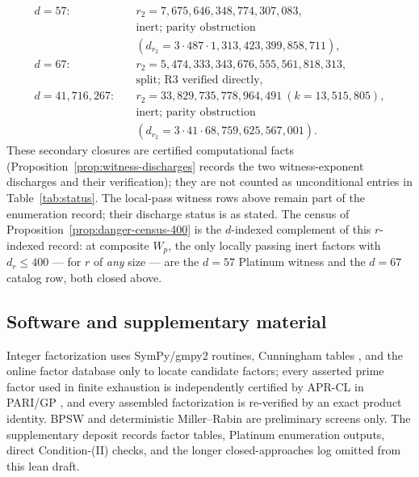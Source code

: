 \documentclass[11pt]{amsart}
\theoremstyle{plain}
\theoremstyle{definition}
\theoremstyle{remark}
\numberwithin{equation}{section}
\begin{document}
\[
  \begin{aligned}
  d=57:&\quad r_2=7{,}675{,}646{,}348{,}774{,}307{,}083,\\
       &\quad \text{inert; parity obstruction}\\
       &\quad (d_{r_2}=3\cdot487\cdot1{,}313{,}423{,}399{,}858{,}711),\\
  d=67:&\quad r_2=5{,}474{,}333{,}343{,}676{,}555{,}561{,}818{,}313,\\
       &\quad \text{split; R3 verified directly},\\
  d=41{,}716{,}267:&\quad r_2=33{,}829{,}735{,}778{,}964{,}491\ (k=13{,}515{,}805),\\
       &\quad \text{inert; parity obstruction}\\
       &\quad (d_{r_2}=3\cdot41\cdot68{,}759{,}625{,}567{,}001).
  \end{aligned}
\]
These secondary closures are certified computational facts (Proposition~\ref{prop:witness-discharges} records the two witness-exponent discharges and their verification); they are not counted as unconditional entries in Table~\ref{tab:status}. The local-pass witness rows above remain part of the enumeration record; their discharge status is as stated. The census of Proposition~\ref{prop:danger-census-400} is the $d$-indexed complement of this $r$-indexed record: at composite $W_p$, the only locally passing inert factors with $d_r \leq 400$ --- for $r$ of \emph{any} size --- are the $d = 57$ Platinum witness and the $d = 67$ catalog row, both closed above.

\subsection{Software and supplementary material}\label{sec:toolchain}

Integer factorization uses SymPy/gmpy2 routines, Cunningham tables \cite{ref:Cunningham}, and the online factor database \cite{ref:FactorDB} only to locate candidate factors; every asserted prime factor used in finite exhaustion is independently certified by APR-CL in PARI/GP \cite{ref:CohenLenstra}, and every assembled factorization is re-verified by an exact product identity. BPSW and deterministic Miller--Rabin are preliminary screens only. The supplementary deposit records factor tables, Platinum enumeration outputs, direct Condition-(II) checks, and the longer closed-approaches log omitted from this lean draft.
\end{document}
